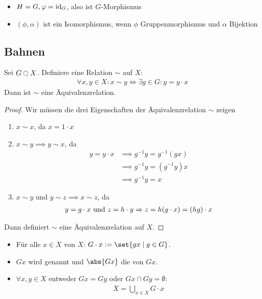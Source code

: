 \begin{definition}
	\begin{itemize}
		\item $H = G, \varphi = \operatorname{id}_G$, also ist $G$-Morphismus
		\item $(\phi, \alpha)$ ist ein Isomorphismus, wenn $\phi$ Gruppenmorphismus und $\alpha$ Bijektion
	\end{itemize}
\end{definition}
\subsection*{Bahnen}
\begin{lemma}
	Sei $G \Circlearrowleft X$. Definiere eine Relation $\sim$ auf $X$:
	\begin{align*}
		\forall x,y \in X \colon x \sim y \Leftrightarrow \exists g \in G\colon y = y \cdot x
	\end{align*}
	Dann ist $\sim$ eine Äquivalenzrelation.
\end{lemma}
\begin{proof} Wir müssen die drei Eigenschaften der Äquivalenzrelation $\sim$ zeigen
	\begin{enumerate}
		\item $x \sim x$, da $x = 1 \cdot x$
		\item $x \sim y \implies y \sim x$, da
		\begin{align*}
			y = y\cdot x &\implies g^{-1}y = y^{-1}(gx)\\
			&\implies g^{-1} y = (g^{-1}y) x\\
			& \implies g^{-1} y = x
		\end{align*}
		\item $x \sim y$ und $y \sim z \implies x \sim z$, da
		\begin{align*}
			y = g\cdot x \text{ und } z = h \cdot y \Rightarrow z = h(g\cdot x) = (hg)\cdot x
		\end{align*}
	\end{enumerate}
	Dann definiert $\sim$ eine Äquivalenzrelation auf $X$.
\end{proof}
\begin{definition}
	\begin{itemize}
		\item Für alle $x \in X$  von $X$: $G\cdot x := \set{gx \mid g \in G}$.
		\item $Gx$ wird  genannt und $\abs{Gx}$ die  von $Gx$.
		\item $\forall x,y \in X$ entweder $Gx = Gy$ oder $Gx \cap Gy = \emptyset$:
		\begin{align*}
			X = \bigcup_{x \in X}G \cdot x
		\end{align*}
	\end{itemize}
\end{definition}
